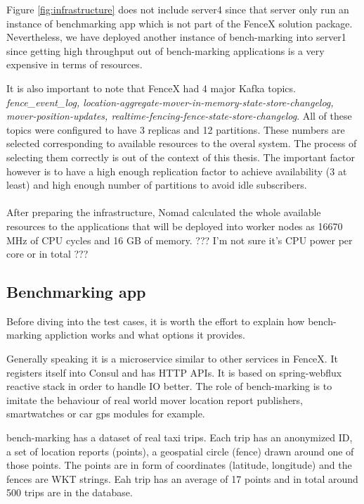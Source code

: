 \documentclass[a4]{report}
\begin{document}
        Figure \ref{fig:infrastructure} does not include server4 since that server only run an instance of benchmarking app
        which is not part of the FenceX solution package.
        Nevertheless, we have deployed another instance of bench-marking into server1 since getting high throughput out of
        bench-marking applications is a very expensive in terms of resources.

        It is also important to note that FenceX had 4 major Kafka topics.
        \textit{fence\_event\_log, location-aggregate-mover-in-memory-state-store-changelog, mover-position-updates,
            realtime-fencing-fence-state-store-changelog}.
        All of these topics were configured to have 3 replicas and 12 partitions.
        These numbers are selected corresponding to available resources to the overal system.
        The process of selecting them correctly is out of the context of this thesis.
        The important factor however is to have a high enough replication factor to achieve availability (3 at least) and
        high enough number of partitions to avoid idle subscribers.

        \paragraph{}
        After preparing the infrastructure, Nomad calculated the whole available resources to the applications that will
        be deployed into worker nodes as 16670 MHz of CPU cycles and 16 GB of memory.
        ??? I'm not sure it's CPU power per core or in total ???

        \subsection{Benchmarking app}
        Before diving into the test cases, it is worth the effort to explain how bench-marking appliction works and what
        options it provides.

        Generally speaking it is a microservice similar to other services in FenceX.
        It registers itself into Consul and has HTTP APIs.
        It is based on spring-webflux reactive stack in order to handle IO better.
        The role of bench-marking is to imitate the behaviour of real world mover location report publishers,
        smartwatches or car gps modules for example.

        bench-marking has a dataset of real taxi trips.
        Each trip has an anonymized ID, a set of location reports (points), a geospatial circle (fence) drawn around one
        of those points.
        The points are in form of coordinates (latitude, longitude) and the fences are WKT strings.
        Eah trip has an average of 17 points and in total around 500 trips are in the database.
\end{document}
